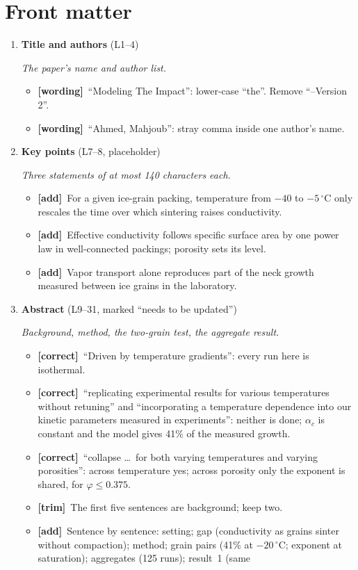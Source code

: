 \documentclass[11pt]{article}
\newcommand{\Pg}[3]{\item \textbf{#1} {\small(#2)}\par\textit{#3}}
\newcommand{\tC}{\textcolor{miss}{\textbf{[correct]}}\ }
\newcommand{\tG}{\textcolor{stale}{\textbf{[wording]}}\ }
\newcommand{\tT}{\textcolor{cut}{\textbf{[trim]}}\ }
\newcommand{\tA}{\textcolor{have}{\textbf{[add]}}\ }
\begin{document}
\section*{Front matter}
\begin{enumerate}
\Pg{Title and authors}{L1--4}{The paper's name and author list.}
  \begin{itemize}
  \item \tG ``Modeling The Impact'': lower-case ``the''. Remove ``--Version 2''.
  \item \tG ``Ahmed, Mahjoub'': stray comma inside one author's name.
  \end{itemize}
\Pg{Key points}{L7--8, placeholder}{Three statements of at most 140 characters each.}
  \begin{itemize}
  \item \tA For a given ice-grain packing, temperature from $-40$ to
    $-5\,^{\circ}$C only rescales the time over which sintering raises
    conductivity.
  \item \tA Effective conductivity follows specific surface area by one power
    law in well-connected packings; porosity sets its level.
  \item \tA Vapor transport alone reproduces part of the neck growth measured
    between ice grains in the laboratory.
  \end{itemize}
\Pg{Abstract}{L9--31, marked ``needs to be updated''}{Background, method, the two-grain test, the aggregate result.}
  \begin{itemize}
  \item \tC ``Driven by temperature gradients'': every run here is
    isothermal.
  \item \tC ``replicating experimental results for various temperatures
    without retuning'' and ``incorporating a temperature dependence into our
    kinetic parameters measured in experiments'': neither is done;
    $\alpha_c$ is constant and the model gives 41\% of the measured growth.
  \item \tC ``collapse \ldots\ for both varying temperatures and varying
    porosities'': across temperature yes; across porosity only the exponent
    is shared, for $\varphi \le 0.375$.
  \item \tT The first five sentences are background; keep two.
  \item \tA Sentence by sentence: setting; gap (conductivity as grains sinter
    without compaction); method; grain pairs (41\% at $-20\,^{\circ}$C;
    exponent at saturation); aggregates (125 runs); result~1 (same

\end{itemize}
\end{enumerate}
\end{document}
